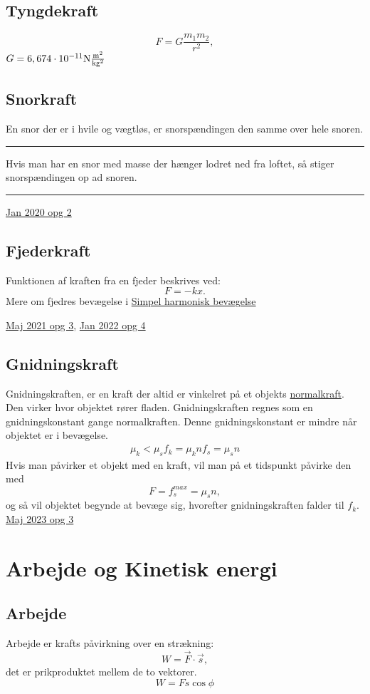 \documentclass[a4paper,oneside,article]{memoir}
\begin{document}
\subsection{Tyngdekraft}
\[F = G\frac{m_1m_2}{r^2},\]
$G=6,674\cdot 10^{-11}\text{N}\frac{\text{m}^2}{\text{kg}^2}$

\subsection{Snorkraft}
En snor der er i hvile og vægtløs, er snorspændingen den samme over hele snoren. 
\plainbreak{1}
Hvis man har en snor med masse der hænger lodret ned fra loftet, så stiger snorspændingen op ad snoren. 
\plainbreak{1}
\hyperref[asc:Jan 2020 opg 2]{Jan 2020 opg 2}

\subsection{Fjederkraft} \label{ssc:fjederkraft}
Funktionen af kraften fra en fjeder beskrives ved: \[F=-kx.\] 
Mere om fjedres bevægelse i \hyperref[sc:SHB]{Simpel harmonisk bevægelse}

\hyperref[asc:Maj 2021 opg 3]{Maj 2021 opg 3}, \hyperref[asc:Jan 2022 opg 4]{Jan 2022 opg 4}

\subsection{Gnidningskraft} \label{scc:gnidning}
Gnidningskraften, er en kraft der altid er vinkelret på et objekts \hyperref[scc:normalkraft]{normalkraft}. Den virker hvor objektet rører fladen. Gnidningskraften regnes som en gnidningskonstant gange normalkraften. Denne gnidningskonstant er mindre når objektet er i bevægelse. 
\begin{align*}
    \mu_k < \mu_s
    f_k = \mu_kn
    f_s = \mu_sn
\end{align*}
Hvis man påvirker et objekt med en kraft, vil man på et tidspunkt påvirke den med \[F=f_s^{max}=\mu_sn,\] og så vil objektet begynde at bevæge sig, hvorefter gnidningskraften falder til $f_k$. 
\hyperref[asc:Maj 2023 opg 3]{Maj 2023 opg 3}

\newpage
\section{Arbejde og Kinetisk energi}
\subsection{Arbejde} \label{scc:Arbejde}
Arbejde er krafts påvirkning over en strækning: \[W = \Vec{F}\cdot \Vec{s},\] det er prikproduktet mellem de to vektorer. 
\[W = Fs\cos{\phi}\]
\end{document}
